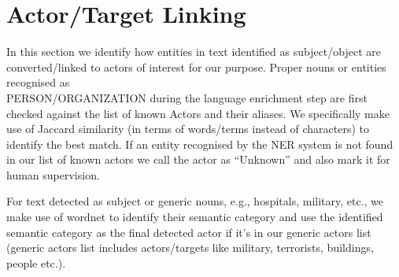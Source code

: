 \section{Actor/Target Linking}
In this section we identify how entities in text identified as subject/object are converted/linked to actors of interest for our purpose. Proper nouns or entities recognised as \\
PERSON/ORGANIZATION during the language enrichment step are first checked against the list of known Actors and their aliases. We specifically make use of Jaccard similarity (in terms of words/terms instead of characters) to identify the best match.  If an entity recognised by the NER system is not found in our list of known actors we call the actor as “Unknown” and also mark it for human supervision.

For text detected as subject or generic nouns, e.g., hospitals, military, etc., we make use of wordnet to identify their semantic category and use the identified semantic category as the final detected actor if it's in our generic actors list (generic actors list includes actors/targets like military, terrorists, buildings, people etc.).
